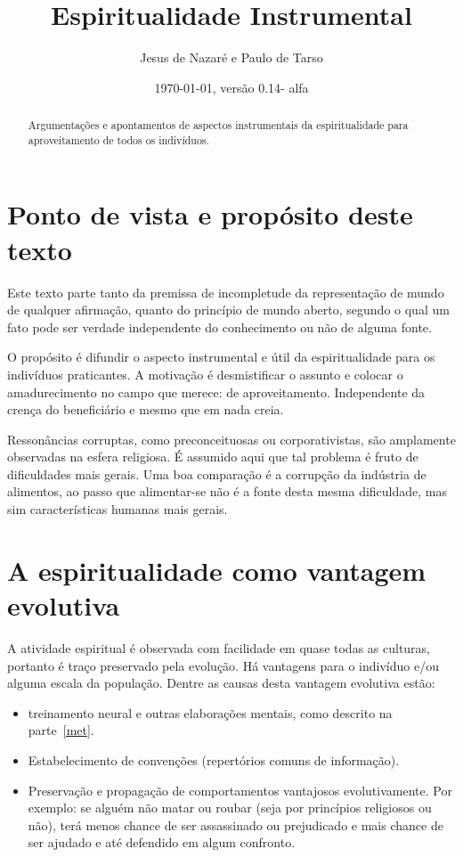 \documentclass[a4paper]{article}
\title{Espiritualidade Instrumental}
\author{Jesus de Nazaré e Paulo de Tarso}
\date{\today, versão 0.14- alfa}
\begin{document}
\maketitle

\begin{abstract}
Argumentações e apontamentos de aspectos instrumentais da espiritualidade para
aproveitamento de todos os indivíduos.
\end{abstract}

\tableofcontents

\section{Ponto de vista e propósito deste texto}

Este texto parte tanto da premissa de incompletude da representação de mundo de
qualquer afirmação, quanto do princípio de mundo aberto, segundo o qual um fato
pode ser verdade independente do conhecimento ou não de alguma fonte.

O propósito é difundir o aspecto instrumental e útil da espiritualidade para os
indivíduos praticantes. A motivação é desmistificar o assunto e colocar o
amadurecimento no campo que merece: de aproveitamento. Independente da crença do
beneficiário e mesmo que em nada creia.

Ressonâncias corruptas, como preconceituosas ou corporativistas, são amplamente
observadas na esfera religiosa. É assumido aqui que tal problema é fruto de
dificuldades mais gerais. Uma boa comparação é a corrupção da indústria de
alimentos, ao passo que alimentar-se não é a fonte desta mesma dificuldade, mas
sim características humanas mais gerais.

\section{A espiritualidade como vantagem evolutiva}

A atividade espiritual é observada com facilidade em quase todas as culturas,
portanto é traço preservado pela evolução. Há vantagens para o indivíduo e/ou
alguma escala da população. Dentre as causas desta vantagem evolutiva estão:

\begin{itemize}
  \item treinamento neural e outras elaborações mentais, como descrito na
  parte~\ref{met}.

  \item Estabelecimento de convenções (repertórios comuns de informação).

  \item Preservação e propagação de comportamentos vantajosos evolutivamente.
  Por exemplo: se alguém não matar ou roubar (seja por princípios religiosos ou
  não), terá menos chance de ser assassinado ou prejudicado e mais chance de ser
  ajudado e até defendido em algum confronto.
\end{itemize}
\end{document}
